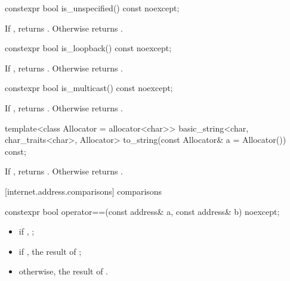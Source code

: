%
\begin{itemdecl}
constexpr bool is_unspecified() const noexcept;
\end{itemdecl}

\begin{itemdescr}
\pnum
\returns If , returns . Otherwise returns .
\end{itemdescr}

%
\begin{itemdecl}
constexpr bool is_loopback() const noexcept;
\end{itemdecl}

\begin{itemdescr}
\pnum
\returns If , returns . Otherwise returns .
\end{itemdescr}

%
\begin{itemdecl}
constexpr bool is_multicast() const noexcept;
\end{itemdecl}

\begin{itemdescr}
\pnum
\returns If , returns . Otherwise returns .
\end{itemdescr}

%
\begin{itemdecl}
template<class Allocator = allocator<char>>
  basic_string<char, char_traits<char>, Allocator>
    to_string(const Allocator& a = Allocator()) const;
\end{itemdecl}

\begin{itemdescr}
\pnum
\returns If , returns . Otherwise returns .
\end{itemdescr}


%
[internet.address.comparisons]{ comparisons}

\begin{itemdecl}
constexpr bool operator==(const address& a, const address& b) noexcept;
\end{itemdecl}

\begin{itemdescr}
\pnum
\returns 
\begin{itemize}
\item
 if , ;
\item
 if , the result of ;
\item
 otherwise, the result of .
\end{itemize}
\end{itemdescr}


